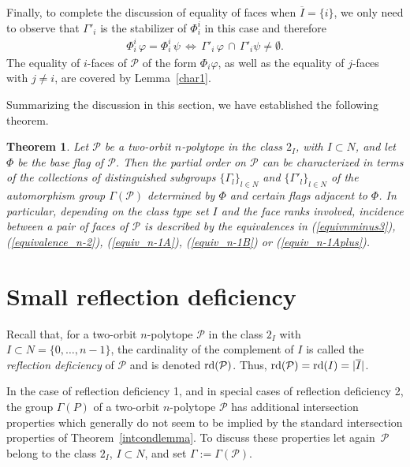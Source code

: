 \documentclass[12pt]{article}
\renewcommand{\phi}{\varphi}
\renewcommand{\bar}{\overline}
\renewcommand{\>}{\rangle}
\newtheorem{theorem}{Theorem}[section]
\theoremstyle{definition}\newtheorem{definition}{Definition}[section]
\begin{document}
Finally, to complete the discussion of equality of faces when $\bar{I}=\{i\}$, we only need to observe that $\Gamma'_i$ is the stabilizer of $\Phi^i_i$ in this case and therefore
\begin{eqnarray}
\label{equiv_n-1Aplus}
\Phi^i_i\,\phi=\Phi^i_i\,\psi \,\Longleftrightarrow\, \Gamma'_i\,\phi \,\cap \,\Gamma'_i \psi \neq \emptyset.
\end{eqnarray} 
The equality of $i$-faces of $\mathcal{P}$ of the form $\Phi_i\varphi$, as well as the equality of $j$-faces with $j\neq i$, are covered by Lemma~\ref{char1}.
\medskip

Summarizing the discussion in this section, we have established the following theorem.

\begin{theorem}
\label{ordercharacterize}
Let $\mathcal{P}$ be a two-orbit $n$-polytope in the class $2_I$, with $I\subset N$, and let~$\Phi$ be the base flag of $\mathcal{P}$. Then the partial order on $\mathcal{P}$ can be characterized in terms of the collections of distinguished subgroups $\big\{\Gamma_l\big\}_{l\in N}$ and $\big\{\Gamma'_l\big\}_{l\in N}$ of the automorphism group $\Gamma(\mathcal{P})$ determined by $\Phi$ and certain flags adjacent to $\Phi$. In particular, depending on the class type set $I$ and the face ranks involved, incidence between a pair of faces of $\mathcal{P}$ is described by the equivalences in (\ref{equivnminus3}), (\ref{equivalence_n-2}), (\ref{equiv_n-1A}), (\ref{equiv_n-1B}) or (\ref{equiv_n-1Aplus}).  
\end{theorem}

\section{Small reflection deficiency}
\label{srd}

Recall that, for a two-orbit $n$-polytope $\mathcal{P}$ in the class $2_I$ with $I\subset N=\{0,\ldots,n-1\}$, the cardinality of the complement of $I$ is called the {\em reflection deficiency\/} of $\mathcal{P}$ and is denoted ${\rm rd}(\mathcal{P})$. Thus, ${\rm rd}(\mathcal{P})={\rm rd}(I)=|\bar{I}|$.

In the case of reflection deficiency 1, and in special cases of reflection deficiency 2, the group $\Gamma(P)$ of a two-orbit $n$-polytope $\mathcal{P}$ has additional intersection properties which generally do not seem to be implied by the standard intersection properties of Theorem~\ref{intcondlemma}. To discuss these properties let again~$\mathcal{P}$ belong to the class $2_I$, $I\subset N$, and set $\Gamma:=\Gamma(\mathcal{P})$. 
\end{document}
